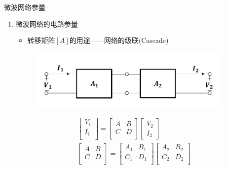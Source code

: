 \begin{frame}{微波网络参量}
    \begin{enumerate}
        \item 微波网络的电路参量
              \begin{itemize}
                  \item 转移矩阵$[A]$的用途——网络的级联(Cascade)
              \end{itemize}
              \begin{figure}
                  \includegraphics[width=10cm]{Cha5//fig5-9.pdf}
              \end{figure}
              \begin{gather*}
                  \begin{bmatrix*}
                      V_1 \\
                      I_1 \\
                  \end{bmatrix*}=
                  \begin{bmatrix*}
                      A & B \\
                      C & D \\
                  \end{bmatrix*}
                  \begin{bmatrix*}
                      V_2 \\
                      I_2
                  \end{bmatrix*}\\
                  \begin{bmatrix*}
                      A & B \\
                      C & D \\
                  \end{bmatrix*}=
                  \begin{bmatrix*}
                      A_1 & B_1 \\
                      C_1 & D_1 \\
                  \end{bmatrix*}
                  \begin{bmatrix*}
                      A_2 & B_2 \\
                      C_2 & D_2 \\
                  \end{bmatrix*}
              \end{gather*}
    \end{enumerate}
\end{frame}

